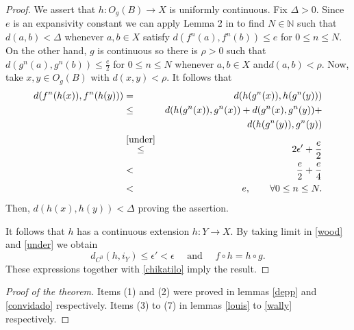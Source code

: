 \documentclass[11pt,letterpaper]{amsart}
\theoremstyle{plain}
\begin{document}
\begin{proof}
We assert that $h:O_g(B)\to X$ is uniformly continuous.
Fix $\Delta>0$. Since $e$ is an expansivity constant we can apply Lemma 2 in \cite{w}
to find $N\in\mathbb{N}$ such that
$d(a,b)<\Delta$ whenever $a,b\in X$ satisfy
$d(f^n(a),f^n(b))\leq e$ for $0\leq n\leq N$.
On the other hand, $g$ is continuous so there is $\rho>0$ such that
$d(g^n(a),g^n(b))\leq \frac{e}2$ for $0\leq n\leq N$ whenever $a,b\in X$ and$d(a,b)<\rho$.
Now, take $x,y\in O_g(B)$ with $d(x,y)<\rho$.
It follows that
\begin{eqnarray*}
d(f^n(h(x)),f^n(h(y)))& = & d(h(g^n(x)),h(g^n(y)))\\
& \leq & d(h(g^n(x)),g^n(x))+d(g^n(x),g^n(y))+\\
& & d(h(g^n(y)),g^n(y))\\
& \overset{\eqref{under}}{\leq} & 2\epsilon'+\frac{e}2\\
& < & \frac{e}2+\frac{e}4\\
& < & e,\quad\quad\forall 0\leq n\leq N.
\end{eqnarray*}
Then, $d(h(x),h(y))<\Delta$ proving the assertion.

It follows that $h$ has a continuous extension $h:Y\to X$.
By taking limit in \eqref{wood} and \eqref{under} we obtain
$$
d_{C^0}(h,i_Y)\leq \epsilon'<\epsilon\quad\mbox{ and }\quad f\circ h=h\circ g.
$$
These expressions together with \eqref{chikatilo} imply the result.
\end{proof}




\begin{proof}[Proof of the theorem]
Items (1) and (2) were proved in lemmas \ref{depp} and \ref{convidado}
respectively. 
Items (3) to (7) in lemmas \ref{louis} to \ref{wally} respectively.
\end{proof}
\end{document}
